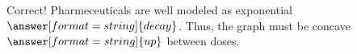 \documentclass{ximera}
\begin{document}
\begin{question}
\begin{question}
\begin{question}
\begin{question}

Correct!  Pharmeceuticals are well modeled as exponential $\answer[format=string]{decay}$. Thus, the graph must be concave 
$\answer[format=string]{up}$ between doses.  

\end{question} 
\end{question}
\end{question}
\end{question}
\end{document}

